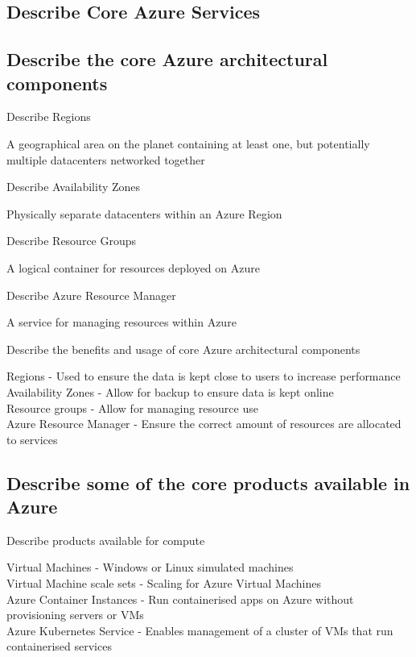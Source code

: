 \documentclass[addpoints]{exam}
\begin{document}
\begin{questions}
\section{Describe Core Azure Services}
\subsection{Describe the core Azure architectural components}
\question Describe Regions
\begin{solution}[2in]
	A geographical area on the planet containing at least one, but potentially multiple datacenters networked together
\end{solution}

\question Describe Availability Zones
\begin{solution}[2in]
	Physically separate datacenters within an Azure Region
\end{solution}

\question Describe Resource Groups
\begin{solution}[2in]
	A logical container for resources deployed on Azure
\end{solution}

\question Describe Azure Resource Manager
\begin{solution}[2in]
	A service for managing resources within Azure
\end{solution}

\question Describe the benefits and usage of core Azure architectural components
\begin{solution}[2in]
	Regions - Used to ensure the data is kept close to users to increase performance\\
	Availability Zones - Allow for backup to ensure data is kept online\\
	Resource groups - Allow for managing resource use\\
	Azure Resource Manager - Ensure the correct amount of resources are allocated to services
\end{solution}
\subsection{Describe some of the core products available in Azure}
\question Describe products available for compute
\begin{solution}[2in]
	Virtual Machines - Windows or Linux simulated machines\\
	Virtual Machine scale sets - Scaling for Azure Virtual Machines\\
	Azure Container Instances - Run containerised apps on Azure without provisioning servers or VMs\\
	Azure Kubernetes Service - Enables management of a cluster of VMs that run containerised services
\end{solution}


\end{questions}
\end{document}
